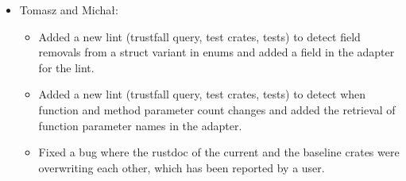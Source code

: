 \documentclass[licencjacka,en]{pracamgr}
\begin{document}
\begin{itemize}
\begin{itemize}
		\end{itemize}

	\item Tomasz and Michał:
		\begin{itemize}
			\item Added a new lint (trustfall query, test crates, tests) to detect field removals
				from a struct variant in enums and added a field in the adapter for the lint.
			\item Added a new lint (trustfall query, test crates, tests) to detect when function
				and method parameter count changes and added the retrieval of function parameter
				names in the adapter.
			\item Fixed a bug where the rustdoc of the current and the baseline crates
				were overwriting each other, which has been reported by a user.
		\end{itemize}


\end{itemize}
\end{document}
